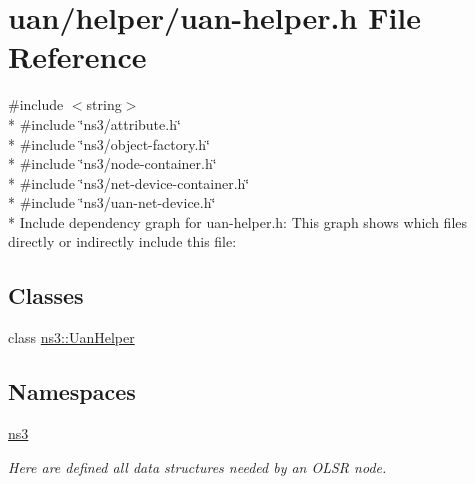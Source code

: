\hypertarget{uan-helper_8h}{}\section{uan/helper/uan-\/helper.h File Reference}
\label{uan-helper_8h}
{\ttfamily \#include $<$string$>$}\\*
{\ttfamily \#include \char`\"{}ns3/attribute.\+h\char`\"{}}\\*
{\ttfamily \#include \char`\"{}ns3/object-\/factory.\+h\char`\"{}}\\*
{\ttfamily \#include \char`\"{}ns3/node-\/container.\+h\char`\"{}}\\*
{\ttfamily \#include \char`\"{}ns3/net-\/device-\/container.\+h\char`\"{}}\\*
{\ttfamily \#include \char`\"{}ns3/uan-\/net-\/device.\+h\char`\"{}}\\*
Include dependency graph for uan-\/helper.h\+:
This graph shows which files directly or indirectly include this file\+:
\subsection*{Classes}
\begin{DoxyCompactItemize}
\item 
class \hyperlink{classns3_1_1UanHelper}{ns3\+::\+Uan\+Helper}
\end{DoxyCompactItemize}
\subsection*{Namespaces}
\begin{DoxyCompactItemize}
\item 
 \hyperlink{namespacens3}{ns3}
\begin{DoxyCompactList}\small\item\em Here are defined all data structures needed by an O\+L\+SR node. \end{DoxyCompactList}\end{DoxyCompactItemize}
